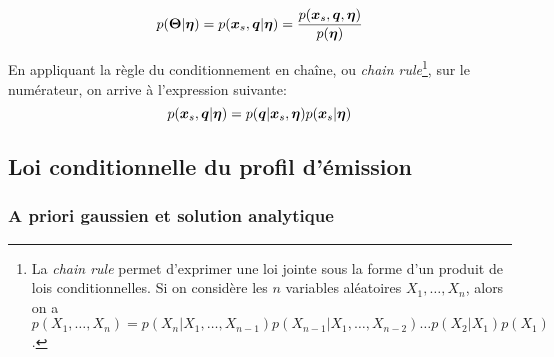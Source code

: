 \begin{equation}
p({\bm{\Theta}}|{\bm{\eta}}) = p({\bm{x}_s}, {\bm{q}} | {\bm{\eta}}) = \dfrac{p({\bm{x}_s}, {\bm{q}}, {\bm{\eta}})}{p({\bm{\eta}})}
\label{eq_conditionalite}
\end{equation}

En appliquant la règle du conditionnement en chaîne, ou \textit{chain rule}\footnote{La \textit{chain rule} permet d'exprimer une loi jointe sous la forme d'un produit de lois conditionnelles. Si on considère les $n$ variables aléatoires $X_1, \dots, X_n$, alors on a $p(X_1, \dots, X_n) = p(X_n|X_1, \dots, X_{n-1})p(X_{n-1}|X_1, \dots, X_{n-2})\dots p(X_2|X_1)p(X_1)$.}, sur le numérateur, on arrive à l'expression suivante:
\begin{equation}
p({\bm{x}_s}, {\bm{q}} | {\bm{\eta}}) = p({\bm{q}} | {\bm{x}_s}, {\bm{\eta}})p({\bm{x}_s} | {\bm{\eta}})
\label{eq_AE_9}
\end{equation}

\subsection{Loi conditionnelle du profil d'émission}

\subsubsection{A priori gaussien et solution analytique}


